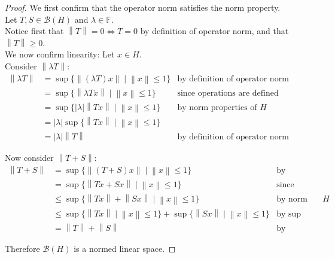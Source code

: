 \documentclass{article}
\theoremstyle{plain}
\theoremstyle{definition}
\newcommand{\abs}[1]{\left\lvert #1 \right\rvert}
\newcommand{\norm}[1]{\left\lVert #1 \right\rVert}
\newcommand{\BH}{\cal{B}(H)}
\newcommand{\bb}[1]{\mathbb{#1}}
\renewcommand{\cal}[1]{\mathcal{#1}}
\begin{document}
        \begin{proof}
                We first confirm that the operator norm satisfies the norm property.\\
                Let $T, S \in \BH$ and $\lambda \in \bb{F}$.\\
                Notice first that $\norm{T} = 0 \iff T = 0$ by definition of operator norm, and that $\norm{T} \geq 0$.\\
                We now confirm linearity:
                Let $x \in H$.\\
                Consider $\norm{\lambda T}$:
                \begin{align*}
                        \norm{\lambda T} 
                        &= \sup\{\norm{(\lambda T)x} \mid \norm{x} \leq 1\} & \text{by definition of operator norm}\\
                        &= \sup\{\norm{\lambda T x} \mid \norm{x} \leq 1\} & \text{since operations are defined pointwise}\\
                        &= \sup\{\abs{\lambda} \norm{Tx} \mid \norm{x} \leq 1\} & \text{by norm properties of $H$}\\
                        &= \abs{\lambda} \sup\{\norm{Tx} \mid \norm{x} \leq 1\}\\
                        &= \abs{\lambda} \norm{T} & \text{by definition of operator norm}
                \end{align*}
                
                Now consider $\norm{T + S}$:
                \begin{align*}
                        \norm{T + S}
                        &= \sup\{\norm{(T + S)x} \mid \norm{x} \leq 1\} & \text{by definition of operator norm}\\
                        &= \sup\{\norm{Tx + Sx} \mid \norm{x} \leq 1\} & \text{since operations are defined pointwise}\\
                        &\leq \sup\{\norm{Tx} + \norm{Sx} \mid \norm{x} \leq 1\} & \text{by norm properties of $H$}\\
                        &\leq \sup\{\norm{Tx} \mid \norm{x} \leq 1\} + \sup\{\norm{Sx} \mid \norm{x} \leq 1\} & \text{by sup properties}\\
                        &= \norm{T} + \norm{S} & \text{by definition of operator norm}
                \end{align*}

                Therefore $\BH$ is a normed linear space.


\end{proof}
\end{document}
